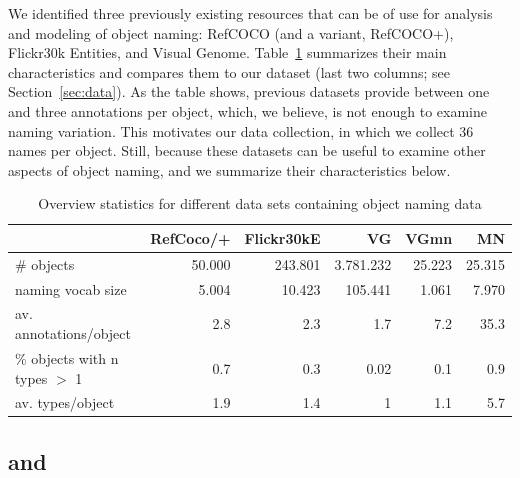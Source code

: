 We identified three previously existing resources that can be of use for analysis and modeling of object naming: RefCOCO (and a variant, RefCOCO+), Flickr30k Entities, and Visual Genome. Table~\ref{tab:compare} summarizes their main characteristics and compares them to our dataset (last two columns; see Section~\ref{sec:data}).
As the table shows, previous datasets provide between one and three annotations per object, which, we believe, is not enough to examine naming variation.
This motivates our data collection, in which we collect 36 names per object.
Still, because these datasets can be useful to examine other aspects of object naming, and we summarize their characteristics below.

\begin{table}
  \centering
  \begin{tabular}{lrrrrr}
    \toprule
    &   RefCoco/+  &  Flickr30kE &           VG &      VGmn &        MN \\
    \midrule
    \# objects & 50.000 & 243.801 & 3.781.232 & 25.223 & 25.315 \\
    naming vocab size &  5.004 &  10.423 &   105.441 &  1.061 &  7.970 \\
    av. annotations/object &      2.8 &       2.3 &         1.7 &      7.2 &     35.3 \\
    \% objects with n types $>$ 1 &      0.7 &       0.3 &         0.02 &      0.1 &      0.9 \\
    av. types/object &      1.9 &       1.4 &         1 &      1.1 &      5.7 \\
    \bottomrule
  \end{tabular}
  \label{tab:compare}
  \caption{Overview statistics for different data sets containing object naming data  }
\end{table}


\subsection{ and }

